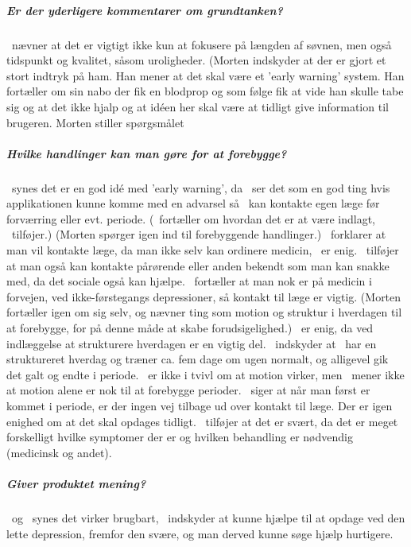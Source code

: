\subparagraph{Er der yderligere kommentarer om grundtanken?}
\pa~nævner at det er vigtigt ikke kun at fokusere på længden af søvnen, men også tidspunkt og kvalitet, såsom uroligheder.
(Morten indskyder at der er gjort et stort indtryk på ham.
Han mener at det skal være et 'early warning' system.
Han fortæller om sin nabo der fik en blodprop og som følge fik at vide han skulle tabe sig og at det ikke hjalp og at idéen her skal være at tidligt give information til brugeren.
Morten stiller spørgsmålet \subparagraph{Hvilke handlinger kan man gøre for at forebygge?}
\pa~synes det er en god idé med 'early warning', da \pa~ser det som en god ting hvis applikationen kunne komme med en advarsel så \pa~kan kontakte egen læge før forværring eller evt. periode.
(\pd~fortæller om hvordan det er at være indlagt, \pe~tilføjer.)
(Morten spørger igen ind til forebyggende handlinger.)
\pa~forklarer at man vil kontakte læge, da man ikke selv kan ordinere medicin, \pe~er enig.
\pa~tilføjer at man også kan kontakte pårørende eller anden bekendt som man kan snakke med, da det sociale også kan hjælpe.
\pe~fortæller at man nok er på medicin i forvejen, ved ikke-førstegangs depressioner, så kontakt til læge er vigtig.
(Morten fortæller igen om sig selv, og nævner ting som motion og struktur i hverdagen til at forebygge, for på denne måde at skabe forudsigelighed.)
\pe~er enig, da ved indlæggelse at strukturere hverdagen er en vigtig del.
\pa~indskyder at \pa~har en struktureret hverdag og træner ca. fem dage om ugen normalt, og alligevel gik det galt og endte i periode.
\pa~er ikke i tvivl om at motion virker, men \pe~mener ikke at motion alene er nok til at forebygge perioder.
\pc~siger at når man først er kommet i periode, er der ingen vej tilbage ud over kontakt til læge.
Der er igen enighed om at det skal opdages tidligt.
\pa~tilføjer at det er svært, da det er meget forskelligt hvilke symptomer der er og hvilken behandling er nødvendig (medicinsk og andet).

\subparagraph{Giver produktet mening?}
\pa~og \pe~synes det virker brugbart, \pc~indskyder at kunne hjælpe til at opdage ved den lette depression, fremfor den svære, og man derved kunne søge hjælp hurtigere.

